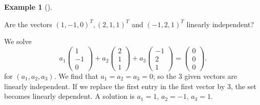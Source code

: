 \documentclass[
  a4paper,
  DIV=11,
  numbers=noendperiod,
  oneside]{scrreprt}
\theoremstyle{definition}
\newtheorem{example}{Example}[chapter]
\theoremstyle{remark}
\begin{document}
\begin{example}[]\protect\hypertarget{exm-li1}{}\label{exm-li1}

Are the vectors \((1,-1,0)^{T},(2,1,1)^{T}\) and \((-1,2,1)^{T}\)
linearly independent?

We solve \[a_{1} \begin{pmatrix}   
1 \\ 
-1 \\ 
0  \end{pmatrix} +a_{2}  \begin{pmatrix}   
2 \\ 
1 \\ 
1  \end{pmatrix} +a_{3}  \begin{pmatrix}   
-1 \\ 
2 \\ 
1  \end{pmatrix} = \begin{pmatrix}   
0 \\ 
0 \\ 
0  \end{pmatrix}.\] for \((a_{1}, a_{2}, a_{3})\). We find that
\(a_{1}=a_{2}=a_{3}=0\); so the 3 given vectors are linearly
independent. If we replace the first entry in the first vector by 3, the
set becomes linearly dependent. A solution is \(a_1=1\), \(a_2=-1\),
\(a_3=1\).

\end{example}
\end{document}
